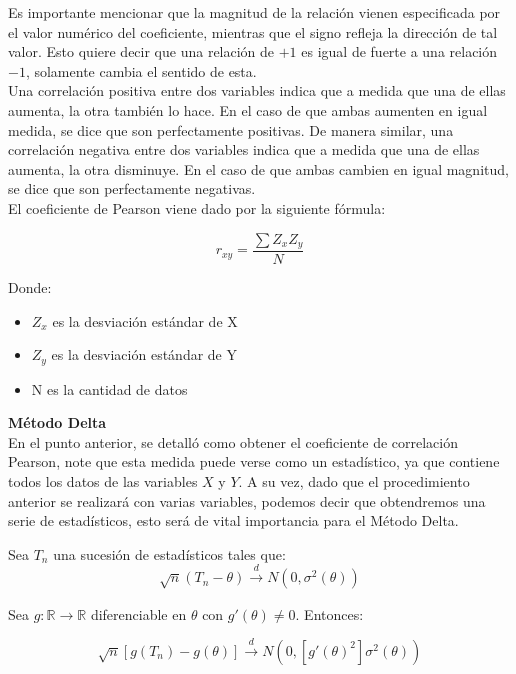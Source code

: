 Es importante mencionar que la magnitud de la relación vienen especificada por el valor numérico del coeficiente, mientras que el signo refleja la dirección de tal valor. Esto quiere decir que una relación de $+1$ es igual de fuerte a una relación $-1$, solamente cambia el sentido de esta.\\

Una correlación positiva entre dos variables indica que a medida que una de ellas aumenta, la otra también lo hace. En el caso de que ambas aumenten en igual medida, se dice que son perfectamente positivas. De manera similar, una correlación negativa entre dos variables indica que a medida que una de ellas aumenta, la otra disminuye. En el caso de que ambas cambien en igual magnitud, se dice que son perfectamente negativas.\\

El coeficiente de Pearson viene dado por la siguiente fórmula:
    
\begin{equation}
     r_{xy} = \frac{\sum Z_x Z_y}{N} 
\end{equation}
   
Donde: 
    
\begin{itemize}
    \item $Z_x$ es la desviación estándar de X
    \item $Z_y$ es la desviación estándar de Y
    \item N es la cantidad de datos 
\end{itemize}

\noindent\textbf{Método Delta} \\
    
En el punto anterior, se detalló como obtener el coeficiente de correlación Pearson, note que esta medida puede verse como un estadístico, ya que contiene todos los datos de las variables $X$ y $Y$. A su vez, dado que el procedimiento anterior se realizará con varias variables, podemos decir que obtendremos una serie de estadísticos, esto será de vital importancia para el Método Delta. \\

\begin{theorem} 
Sea $T_n$ una sucesión de estadísticos tales que:
    \begin{equation*}
        \sqrt{n}(T_n - \theta) \xrightarrow[]{d} N(0, \sigma^2(\theta))
    \end{equation*}

Sea $g: \mathbb{R} \longrightarrow \mathbb{R}$ diferenciable en $\theta$ con $g'(\theta) \neq 0$. Entonces:

    \begin{equation}
        \sqrt{n}[g(T_n) - g(\theta)] \xrightarrow[]{d} N(0, [g'(\theta)^2]\sigma^2(\theta))
    \end{equation}
\end{theorem}

